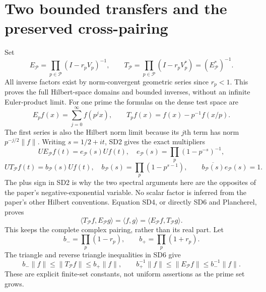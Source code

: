 \section{Two bounded transfers and the preserved cross-pairing}
Set
\[
 E_{\mathcal P}=\prod_{p\in\mathcal P}(I-r_pV_p)^{-1},\qquad
 T_{\mathcal P}=\prod_{p\in\mathcal P}(I-r_pV_p^*)
                 =(E_{\mathcal P}^*)^{-1}.                     \tag{SD4}
\]
All inverse factors exist by norm-convergent geometric series since
$r_p<1$. This proves the full Hilbert-space domains and bounded
inverses, without an infinite Euler-product limit.
For one prime the formulas on the dense test space are
\[
 E_pf(x)=\sum_{j=0}^\infty f(p^jx),\qquad
 T_pf(x)=f(x)-p^{-1}f(x/p).                                    \tag{SD5}
\]
The first series is also the Hilbert norm limit because its $j$th
term has norm $p^{-j/2}\|f\|$.
Writing $s=1/2+it$, SD2 gives the exact multipliers
\[
 UE_{\mathcal P}f(t)=e_{\mathcal P}(s)Uf(t),\quad
 e_{\mathcal P}(s)=\prod_p(1-p^{-s})^{-1},
\]
\[
 UT_{\mathcal P}f(t)=b_{\mathcal P}(s)Uf(t),\quad
 b_{\mathcal P}(s)=\prod_p(1-p^{s-1}),\qquad
 \overline{b_{\mathcal P}(s)}e_{\mathcal P}(s)=1.
                                                               \tag{SD6}
\]
The plus sign in SD2 is why the two spectral arguments here are the
opposites of the paper's negative-exponential variable. No scalar
factor is inferred from the paper's other Hilbert conventions.
Equation SD4, or directly SD6 and Plancherel, proves
\[
 \boxed{\langle T_{\mathcal P}f,E_{\mathcal P}g\rangle
 =\langle f,g\rangle=\langle E_{\mathcal P}f,T_{\mathcal P}g\rangle.}
                                                               \tag{SD7}
\]
This keeps the complete complex pairing, rather than its real part.
Let
\[
 b_- =\prod_p(1-r_p),\qquad b_+=\prod_p(1+r_p).
\]
The triangle and reverse triangle inequalities in SD6 give
\[
 b_-\|f\|\le\|T_{\mathcal P}f\|\le b_+\|f\|,
 \qquad b_+^{-1}\|f\|\le\|E_{\mathcal P}f\|\le b_-^{-1}\|f\|.
                                                               \tag{SD8}
\]
These are explicit finite-set constants, not uniform assertions as
the prime set grows.

